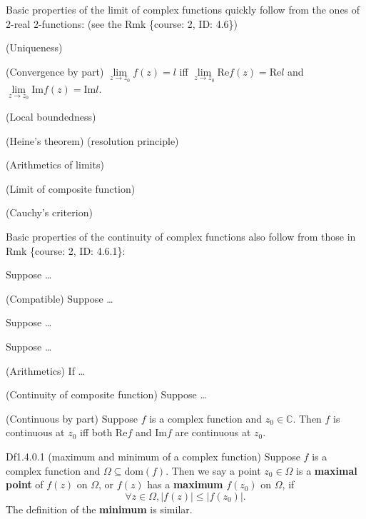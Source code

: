 \documentclass{article}
\begin{document}
\begin{Rmk}{}
    Basic properties of the limit of complex functions quickly follow from the ones of $2$-real $2$-functions: (see the Rmk \{course: 2, ID: 4.6\})
    \begin{compactenum}
        \item \textcolor{Th}{(Uniqueness)}
        \item \textcolor{Th}{(Convergence by part) $\lim\limits_{z\to z_0} f(z) = l$ iff $\lim\limits_{z\to z_0} \text{Re}f(z) = \text{Re}l$ and $\lim\limits_{z\to z_0} \text{Im}f(z) = \text{Im}l$.}
        \item \textcolor{Th}{(Local boundedness)}
        \item \textcolor{Th}{(Heine's theorem) (resolution principle)}
        \item \textcolor{Th}{(Arithmetics of limits)}
        \item \textcolor{Th}{(Limit of composite function)}
        \item \textcolor{Th}{(Cauchy's criterion)}
    \end{compactenum}
    Basic properties of the continuity of complex functions also follow from those in Rmk \{course: 2, ID: 4.6.1\}:
    \begin{compactenum}
        \item \textcolor{Df}{Suppose \dots}
        \item \textcolor{Th}{(Compatible) Suppose \dots}
        \item \textcolor{Th}{Suppose \dots}
        \item \textcolor{Th}{Suppose \dots}
        \item \textcolor{Th}{(Arithmetics) If \dots}
        \item \textcolor{Th}{(Continuity of composite function) Suppose \dots}
        \item \textcolor{Th}{(Continuous by part) Suppose $f$ is a complex function and $z_0\in\mathbb{C}$. Then $f$ is continuous at $z_0$ iff both $\text{Re}f$ and $\text{Im}f$ are continuous at $z_0$.}
    \end{compactenum}
\end{Rmk}

\begin{Df}{Df1.4.0.1 (maximum and minimum of a complex function)}
    Suppose $f$ is a complex function and $\Omega\subseteq\text{dom}(f)$. Then we say a point $z_0\in\Omega$ is a \textbf{maximal point} of $f(z)$ on $\Omega$, or $f(z)$ has a \textbf{maximum} $f(z_0)$ on $\Omega$, if
    $$\forall z\in\Omega, |f(z)| \leq |f(z_0)|.$$
    The definition of the \textbf{minimum} is similar.
\end{Df}
\end{document}
